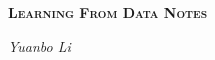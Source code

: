 
\begin{titlepage}
    \centering
    \vspace{2cm}
    {\huge \scshape \bfseries Learning From Data Notes\par}
    \vspace{2cm}
    {\large \itshape Yuanbo Li}
    \vfill
\end{titlepage}
